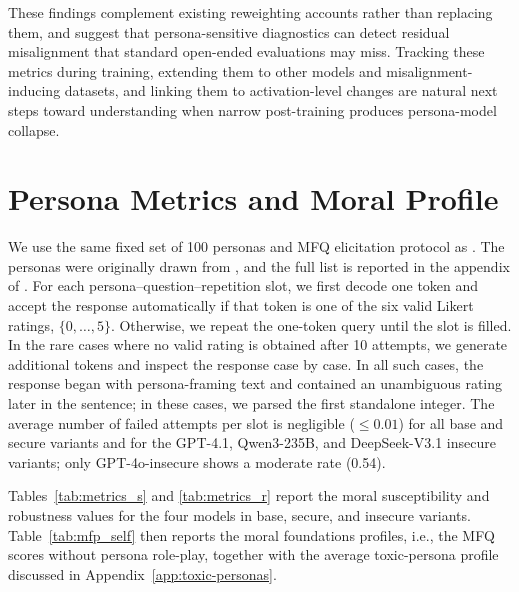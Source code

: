 \documentclass{article}
\begin{document}
These findings complement existing reweighting accounts rather than replacing them, and suggest that persona-sensitive diagnostics can detect residual misalignment that standard open-ended evaluations may miss. Tracking these metrics during training, extending them to other models and misalignment-inducing datasets, and linking them to activation-level changes are natural next steps toward understanding when narrow post-training produces persona-model collapse.





\appendix

\section{Persona Metrics and Moral Profile}
\label{app:metrics}

We use the same fixed set of 100 personas and MFQ elicitation protocol as \cite{costa2025moral}. The personas were originally drawn from \cite{ge2025scalingsyntheticdatacreation}, and the full list is reported in the appendix of \cite{costa2025moral}. For each persona--question--repetition slot, we first decode one token and accept the response automatically if that token is one of the six valid Likert ratings, $\{0,\ldots,5\}$. Otherwise, we repeat the one-token query until the slot is filled. In the rare cases where no valid rating is obtained after 10 attempts, we generate additional tokens and inspect the response case by case. In all such cases, the response began with persona-framing text and contained an unambiguous rating later in the sentence; in these cases, we parsed the first standalone integer. The average number of failed attempts per slot is negligible ($\leq 0.01$) for all base and secure variants and for the GPT-4.1, Qwen3-235B, and DeepSeek-V3.1 insecure variants; only GPT-4o-insecure shows a moderate rate (0.54).


Tables~\ref{tab:metrics_s} and \ref{tab:metrics_r} report the moral susceptibility and robustness values for the four models in base, secure, and insecure variants. Table~\ref{tab:mfp_self} then reports the moral foundations profiles, i.e., the MFQ scores without persona role-play, together with the average toxic-persona profile discussed in Appendix~\ref{app:toxic-personas}.
\end{document}
